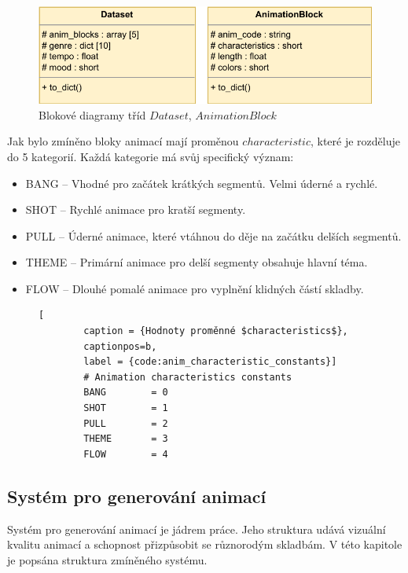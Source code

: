 \begin{figure}[H]
    \centering
    \includegraphics[width = 0.7\linewidth]{obrazky/UML_diagram_Dataset_and_AnimationBlock.pdf}
    \caption{Blokové diagramy tříd $Dataset$, $AnimationBlock$}
    \label{fig:UML_diagram_Dataset_AnimationBlock}
\end{figure}

Jak bylo zmíněno bloky animací mají proměnou $characteristic$, které je rozděluje do 5 kategorií. Každá kategorie má svůj specifický význam: 

\begin{itemize}
    \item BANG -- Vhodné pro začátek krátkých segmentů. Velmi úderné a rychlé.
    \item SHOT -- Rychlé animace pro kratší segmenty.
    \item PULL -- Úderné animace, které vtáhnou do děje na začátku delších segmentů.
    \item THEME -- Primární animace pro delší segmenty obsahuje hlavní téma.
    \item FLOW -- Dlouhé pomalé animace pro vyplnění klidných částí skladby.
\end{itemize}

\begin{figure}[H]
    \begin{lstlisting}[
        caption = {Hodnoty proměnné $characteristics$},
        captionpos=b,
        label = {code:anim_characteristic_constants}]
        # Animation characteristics constants
        BANG        = 0
        SHOT        = 1
        PULL        = 2
        THEME       = 3
        FLOW        = 4
    \end{lstlisting}
\end{figure}

\subsection{Systém pro generování animací} \label{sec:System_generovani_animaci}

Systém pro generování animací je jádrem práce. Jeho struktura udává vizuální kvalitu animací a schopnost přizpůsobit se různorodým skladbám. V této kapitole je popsána struktura zmíněného systému. 


